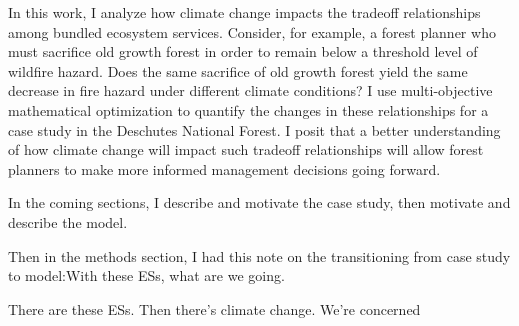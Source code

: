 In this work, I analyze how climate change impacts the tradeoff relationships among bundled ecosystem services. Consider, for example, a forest planner who must sacrifice old growth forest in order to remain below a threshold level of wildfire hazard. Does the same sacrifice of old growth forest yield the same decrease in fire hazard under different climate conditions? I use multi-objective mathematical optimization to quantify the changes in these relationships for a case study in the Deschutes National Forest. I posit that a better understanding of how climate change will impact such tradeoff relationships will allow forest planners to make more informed management decisions going forward.

In the coming sections, I describe and motivate the case study, then motivate and describe the model.

Then in the methods section, I had this note on the transitioning from case study to model:With these ESs, what are we going.

There are these ESs. Then there's climate change. We're concerned  

